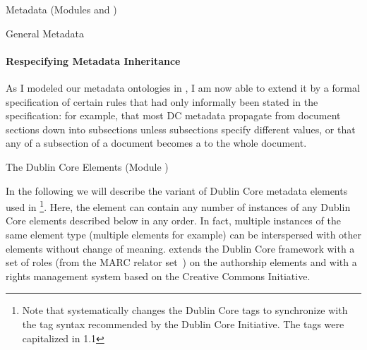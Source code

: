 \begin{tchapter}[id=metadata,short=Metadata]{Metadata (Modules {} and  {})}
\begin{tsection}{General Metadata}
\paragraph{Respecifying Metadata Inheritance}
\label{sec:new-metadata-inherit}

As I modeled our metadata ontologies in \omdoc, I am now able to extend it by a formal
specification of certain rules that had only informally been stated in the 
specification: for example, that most DC metadata propagate from document sections down
into subsections unless subsections specify different values, or that any
 of a subsection of a document becomes a  to the
whole document.





\end{tsection}


\begin{tsection}[id=dc-elements]{The Dublin Core Elements (Module {})}

In the following we will describe the variant of Dublin Core metadata elements used in
{\omdoc}\footnote{Note that {} systematically changes the Dublin Core {\xml}
  tags to synchronize with the tag syntax recommended by the Dublin Core Initiative. The
  tags were capitalized in {\omdoc}1.1}.  Here, the {} element can
contain any number of instances of any Dublin Core elements described below in any
order. In fact, multiple instances of the same element type (multiple
{} elements for example) can be interspersed with other
elements without change of meaning.  {\omdoc} extends the Dublin Core framework with a set
of roles (from the MARC relator set~\cite{Marc:relators03}) on the authorship elements and
with a rights management system based on the Creative Commons Initiative.


\end{tsection}
\end{tchapter}
